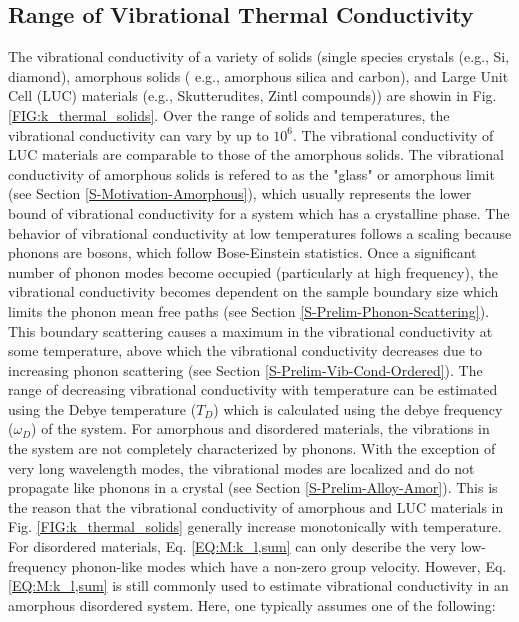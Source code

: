 \documentclass[letterpaper,12pt]{article}
\begin{document}
\subsection{\label{S-Back-Lattice-Cond-Range}Range of Vibrational Thermal Conductivity}
The vibrational conductivity of a variety of solids (single species crystals (e.g., Si, diamond), amorphous solids ( e.g., amorphous silica and carbon), and Large Unit Cell (LUC) materials (e.g., Skutterudites, Zintl compounds)) are showin in Fig. \ref{FIG:k_thermal_solids}. Over the range of solids and temperatures, the vibrational conductivity can vary by up to $10^6$. The vibrational conductivity of LUC materials are comparable to those of the amorphous solids. The vibrational conductivity of amorphous solids is refered to as the "glass" or amorphous limit (see Section \ref{S-Motivation-Amorphous}), which usually represents the lower bound of vibrational conductivity for a system which has a crystalline phase.\cite{cahill1987,cahill1992}
The behavior of vibrational conductivity at low temperatures follows a scaling because phonons are bosons, which follow Bose-Einstein statistics.\cite{srivastava1990,stephens1971,freeman1986} Once a significant number of phonon modes become occupied (particularly at high frequency), the vibrational conductivity becomes dependent on the sample boundary size which limits the phonon mean free paths (see Section \ref{S-Prelim-Phonon-Scattering}). This boundary scattering causes a maximum in the vibrational conductivity at some temperature, above which the vibrational conductivity decreases due to increasing phonon scattering (see Section \ref{S-Prelim-Vib-Cond-Ordered}). The range of decreasing vibrational conductivity with temperature can be estimated using the Debye temperature ($T_D$) which is calculated using the debye frequency ($\omega_D$) of the system.\cite{ashcroft1976,srivastava1990}
For amorphous and disordered materials, the vibrations in the system are not completely characterized by phonons. With the exception of very long wavelength modes, the vibrational modes are localized and do not propagate like
phonons in a crystal (see Section \ref{S-Prelim-Alloy-Amor}). This is the reason that the vibrational conductivity of amorphous and LUC materials in Fig. \ref{FIG:k_thermal_solids} generally increase monotonically with temperature. For disordered materials, Eq$.$ \eqref{EQ:M:k_l,sum} can only describe the very low-frequency phonon-like modes which have a non-zero group velocity. However, Eq$.$ \eqref{EQ:M:k_l,sum} is still commonly used to estimate vibrational conductivity in an amorphous disordered system. Here, one typically assumes one of the following: 
\end{document}
